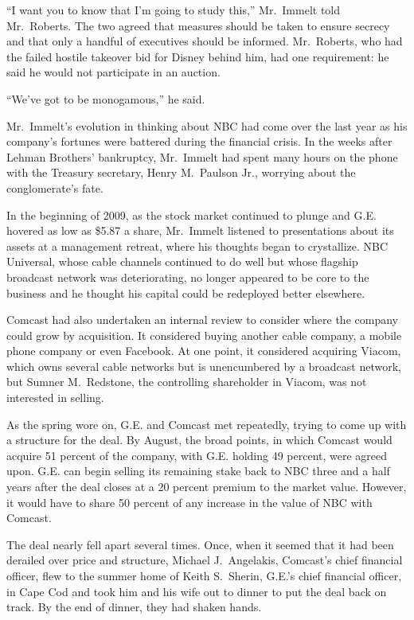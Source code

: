 ﻿\documentclass[12pt]{article}
\begin{document}
``I want you to know that I'm going to study this,'' Mr.~Immelt told Mr.~Roberts. The two agreed
that measures should be taken to ensure secrecy and that only a handful of executives should be
informed. Mr.~Roberts, who had the failed hostile takeover bid for Disney behind him, had one
requirement: he said he would not participate in an auction.

``We've got to be monogamous,'' he said.

Mr.~Immelt's evolution in thinking about NBC had come over the last year as his company's fortunes
were battered during the financial crisis. In the weeks after Lehman Brothers' bankruptcy,
Mr.~Immelt had spent many hours on the phone with the Treasury secretary, Henry M.~Paulson Jr.,
worrying about the conglomerate's fate.

In the beginning of 2009, as the stock market continued to plunge and G.E. hovered as low as \$5.87
a share, Mr.~Immelt listened to presentations about its assets at a management retreat, where his
thoughts began to crystallize. NBC Universal, whose cable channels continued to do well but whose
flagship broadcast network was deteriorating, no longer appeared to be core to the business and he
thought his capital could be redeployed better elsewhere.

Comcast had also undertaken an internal review to consider where the company could grow by
acquisition. It considered buying another cable company, a mobile phone company or even Facebook. At
one point, it considered acquiring Viacom, which owns several cable networks but is unencumbered by
a broadcast network, but Sumner M.~Redstone, the controlling shareholder in Viacom, was not
interested in selling.

As the spring wore on, G.E. and Comcast met repeatedly, trying to come up with a structure for the
deal. By August, the broad points, in which Comcast would acquire 51 percent of the company, with
G.E. holding 49 percent, were agreed upon. G.E. can begin selling its remaining stake back to NBC
three and a half years after the deal closes at a 20 percent premium to the market value. However,
it would have to share 50 percent of any increase in the value of NBC with Comcast.

The deal nearly fell apart several times. Once, when it seemed that it had been derailed over price
and structure, Michael J.~Angelakis, Comcast's chief financial officer, flew to the summer home of
Keith S.~Sherin, G.E.'s chief financial officer, in Cape Cod and took him and his wife out to dinner
to put the deal back on track. By the end of dinner, they had shaken hands.
\end{document}
